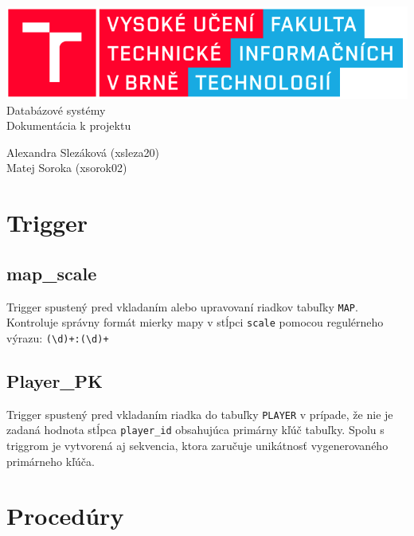 \documentclass[a4paper,12pt,oneside]{article}
\begin{document}
\begin{titlepage}
  \begin{center}
	\includegraphics[origin=c,scale=0.5]{fit}
	\\[6cm]
    {\Huge Databázové systémy}\\[5mm]
    {\LARGE Dokumentácia k projektu}\\
    \begin{flushleft}
      \Large{Alexandra Slezáková (xsleza20)\\Matej Soroka (xsorok02)}
    \end{flushleft}
  \end{center}
\end{titlepage}

\tableofcontents
\newpage

\section{Trigger}

\subsection{map\_scale}
Trigger spustený pred vkladaním alebo upravovaní riadkov tabuľky \texttt{MAP}.\\
Kontroluje správny formát mierky mapy v stĺpci \texttt{scale} pomocou regulérneho výrazu: \texttt{(\textbackslash d)+:(\textbackslash d)+}

\subsection{Player\_PK}
Trigger spustený pred vkladaním riadka do tabuľky \texttt{PLAYER} v prípade, že nie je zadaná hodnota stĺpca \texttt{player\_id} obsahujúca primárny kľúč tabuľky.
Spolu s triggrom je vytvorená aj sekvencia, ktora zaručuje unikátnosť vygenerovaného primárneho kľúča.

\section{Procedúry}
\end{document}
